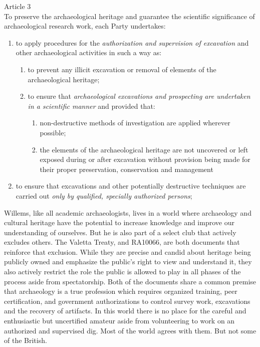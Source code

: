 \begin{displayquote}
	Article 3\\
	To preserve the archaeological heritage and guarantee the scientific significance of archaeological research work, each Party undertakes:
	\begin{enumerate}
		\item to apply procedures for the \textit{authorization and supervision of excavation} and other archaeological activities in such a way as:  
		\begin{enumerate}
			\item to prevent any illicit excavation or removal of elements of the archaeological heritage; 
			\item to ensure that \textit{archaeological excavations and prospecting are undertaken in a scientific manner} and provided that:
			\begin{enumerate}
				\item non-destructive methods of investigation are applied wherever possible;
				\item the elements of the archaeological heritage are not uncovered or left exposed during or after excavation without provision being made for their proper preservation, conservation and management
			\end{enumerate}
		\end{enumerate}
		\item to ensure that excavations and other potentially destructive techniques are carried out \textit{only by qualified, specially authorized persons};
	\end{enumerate}
\end{displayquote}

Willems, like all academic archaeologists, lives in a world where archaeology and cultural heritage have the potential to increase knowledge and improve our understanding of ourselves. But he is also part of a select club that actively excludes others. The Valetta Treaty, and RA10066, are both documents that reinforce that exclusion. While they are precise and candid about heritage being publicly owned and emphasize the public’s right to view and understand it, they also actively restrict the role the public is allowed to play in all phases of the process aside from spectatorship.  Both of the documents share a common premise that archaeology is a true profession which requires organized training, peer certification, and government authorizations to control survey work, excavations and the recovery of artifacts. In this world there is no place for the careful and enthusiastic but uncertified amateur aside from volunteering to work on an authorized and supervised dig. Most of the world agrees with them. But not some of the British.

